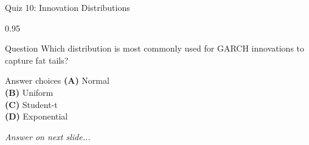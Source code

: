 \documentclass[9pt, aspectratio=169, t]{beamer}
\begin{document}
\begin{frame}{Quiz 10: Innovation Distributions}
    \begin{cminipage}{0.95\textwidth}
    \begin{alertblock}{Question}
        Which distribution is most commonly used for GARCH innovations to capture fat tails?
    \end{alertblock}

    \vspace{0.4cm}

    \begin{block}{Answer choices}
        \textcolor{MainBlue}{\textbf{(A)}} Normal\\[3pt]
        \textcolor{MainBlue}{\textbf{(B)}} Uniform\\[3pt]
        \textcolor{MainBlue}{\textbf{(C)}} Student-t\\[3pt]
        \textcolor{MainBlue}{\textbf{(D)}} Exponential
    \end{block}

    \vspace{0.5cm}

    \begin{center}
        \textit{Answer on next slide...}
    \end{center}
    \end{cminipage}
\end{frame}
\end{document}
